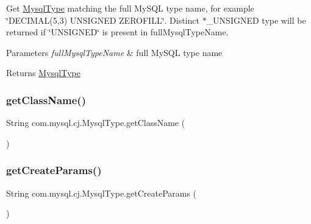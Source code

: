 Get \mbox{\hyperlink{enumcom_1_1mysql_1_1cj_1_1_mysql_type}{Mysql\+Type}} matching the full My\+S\+QL type name, for example \char`\"{}\+D\+E\+C\+I\+M\+A\+L(5,3) U\+N\+S\+I\+G\+N\+E\+D Z\+E\+R\+O\+F\+I\+L\+L\char`\"{}. Distinct $\ast$\+\_\+\+U\+N\+S\+I\+G\+N\+ED type will be returned if \char`\"{}\+U\+N\+S\+I\+G\+N\+E\+D\char`\"{} is present in full\+Mysql\+Type\+Name.


\begin{DoxyParams}{Parameters}
{\em full\+Mysql\+Type\+Name} & full My\+S\+QL type name \\
\hline
\end{DoxyParams}
\begin{DoxyReturn}{Returns}
\mbox{\hyperlink{enumcom_1_1mysql_1_1cj_1_1_mysql_type}{Mysql\+Type}} 
\end{DoxyReturn}
\mbox{\label{enumcom_1_1mysql_1_1cj_1_1_mysql_type_aece90c449e68bd8c428889b5d01864ac}} 
\subsubsection{\texorpdfstring{get\+Class\+Name()}{getClassName()}}
{\footnotesize\ttfamily String com.\+mysql.\+cj.\+Mysql\+Type.\+get\+Class\+Name (\begin{DoxyParamCaption}{ }\end{DoxyParamCaption})}

\mbox{\label{enumcom_1_1mysql_1_1cj_1_1_mysql_type_a8a7d74c445dd27bb413e8588cdf2eae7}} 
\subsubsection{\texorpdfstring{get\+Create\+Params()}{getCreateParams()}}
{\footnotesize\ttfamily String com.\+mysql.\+cj.\+Mysql\+Type.\+get\+Create\+Params (\begin{DoxyParamCaption}{ }\end{DoxyParamCaption})}

